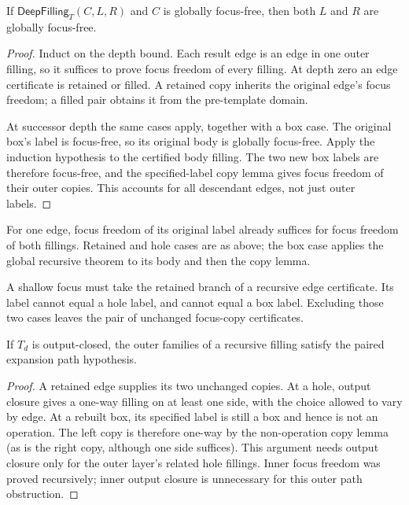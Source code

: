 \begin{theorem}
If $\mathsf{DeepFilling}_T(C,L,R)$ and $C$ is globally focus-free, then
both $L$ and $R$ are globally focus-free.
\end{theorem}
\begin{proof}
Induct on the depth bound. Each result edge is an edge in one outer
filling, so it suffices to prove focus freedom of every filling.
At depth zero an edge certificate is retained or filled. A retained
copy inherits the original edge's focus freedom; a filled pair obtains
it from the pre-template domain.

At successor depth the same cases apply, together with a box case.
The original box's label is focus-free, so its original body is
globally focus-free. Apply the induction hypothesis to the certified
body filling. The two new box labels are therefore focus-free, and the
specified-label copy lemma gives focus freedom of their outer copies.
This accounts for all descendant edges, not just outer labels.
\end{proof}

For one edge, focus freedom of its original label already suffices
for focus freedom of both fillings. Retained and hole cases are as above;
the box case applies the global recursive theorem to its body and then
the copy lemma.

A shallow focus must take the retained branch of a recursive edge
certificate. Its label cannot equal a hole label, and cannot equal a
box label. Excluding those two cases leaves the pair of unchanged
focus-copy certificates.

\begin{lemma}
If $T_d$ is output-closed, the outer families of a recursive filling
satisfy the paired expansion path hypothesis.
\end{lemma}
\begin{proof}
A retained edge supplies its two unchanged copies.
At a hole, output closure gives a one-way filling on at least one side,
with the choice allowed to vary by edge. At a rebuilt box, its specified
label is still a box and hence is not an operation. The left copy is
therefore one-way by the non-operation copy lemma (as is the right copy,
although one side suffices). This argument needs output closure only
for the outer layer's related hole fillings. Inner focus freedom was
proved recursively; inner output closure is unnecessary for this
outer path obstruction.
\end{proof}

